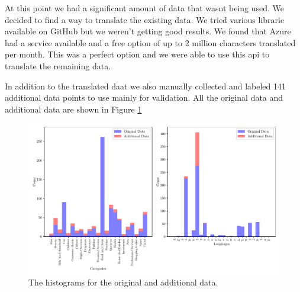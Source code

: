 At this point we had a significant amount of data that wasnt being used. We decided to find a way to translate the existing data. We tried various librarie available on GitHub but we weren't getting good results. We found that Azure had a service available and a free option of up to 2 million characters translated per month. This was a perfect option and we were able to use this api to translate the remaining data.

In addition to the translated daat we also manually collected and labeled 141 additional data points to use mainly for validation. All the original data and additional data are shown in Figure \ref{fig:all_hist}
\begin{figure}[!ht]
  \centering
  \includegraphics[width=\textwidth]{../img/plot_all_hist.pdf}
  \caption{The histograms for the original and additional data.}
  \label{fig:all_hist}
\end{figure}


